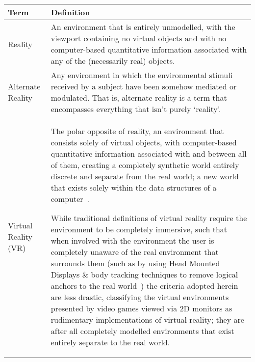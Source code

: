 \begin{center}
\begin{longtable}{| l | p{10cm} |}

\hline	

\textbf{Term} & \textbf{Definition} \\

\hline

		
Reality & An environment that is entirely unmodelled, with the viewport containing no virtual objects and with no computer-based quantitative information associated with any of the (necessarily real) objects. \\
		
\hline
		

Alternate Reality & Any environment in which the environmental stimuli received by a subject have been somehow mediated or modulated. That is, alternate reality is a term that encompasses everything that isn't purely `reality'. \\

\hline
		
		
Virtual Reality (VR) & The polar opposite of reality, an environment that consists solely of virtual objects, with computer-based quantitative information associated with and between all of them, creating a completely synthetic world entirely discrete and separate from the real world; a new world that exists solely within the data structures of a computer~\cite{Milgram1994, Milgram1999, Want2009}.

While traditional definitions of virtual reality require the environment to be completely immersive, such that when involved with the environment the user is completely unaware of the real environment that surrounds them (such as by using Head Mounted Displays \& body tracking techniques to remove logical anchors to the real world~\cite{Druck2006}) the criteria adopted herein are less drastic, classifying the virtual environments presented by video games viewed via 2D monitors as rudimentary implementations of virtual reality; they are after all completely modelled environments that exist entirely separate to the real world. \\
		

\end{longtable}
\end{center}

